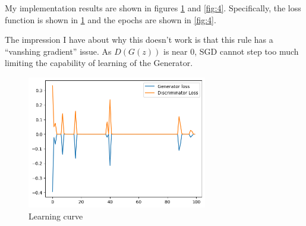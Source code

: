 \documentclass[a4paper]{article}
\theoremstyle{definition}
\newenvironment{soln}{
	\leavevmode\color{blue}\ignorespaces
}{}
\begin{document}
\begin{enumerate} [label=(\alph*)]
		\begin{soln}
            My implementation results are shown in figures \ref{fig:3} and \ref{fig:4}. Specifically, the loss function is shown in \ref{fig:3} and the epochs are shown in \ref{fig:4}.

            The impression I have about why this doesn't work is that this rule has a ``vanshing gradient'' issue. As $D(G(z))$ is near 0, SGD cannot step too much limiting the capability of learning of the Generator.

            \begin{figure}[H]
			\centering
			\includegraphics[width=0.7\textwidth]{loss_q2.png}
			\caption{Learning curve}
			\label{fig:3}
		\end{figure}
		

\end{soln}
\end{enumerate}
\end{document}
